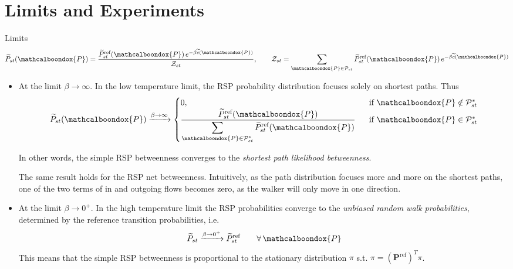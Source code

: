 \documentclass[13pt]{beamer}
\newcommand{\bondox}{\mathcalboondox}
\begin{document}
    \section{Limits and Experiments}

    \begin{frame}[t,allowframebreaks]{Limits}
    \begin{equation*}
    \widetilde{P}_{st}(\bondox{P})=\frac{\widetilde{P}_{st}^{\text{ref}}(\bondox{P})\,e^{-\beta\widetilde{c}(\bondox{P})}}{\mathcal{Z}_{st}},\qquad 
    \mathcal{Z}_{st}=\sum_{\bondox{P}\in \mathcal{P}_{st}}\widetilde{P}_{st}^{\text{ref}}(\bondox{P})\,e^{-\beta\widetilde{c}(\bondox{P})}
    \end{equation*}
    
    \begin{itemize}
        \item At the limit $\beta\to\infty$. In the low temperature limit, the RSP probability distribution focuses solely on shortest paths. Thus 
        \begin{equation*}
        \widetilde{P}_{st}(\bondox{P})\xrightarrow{\beta\to\infty}\begin{cases}
            0, &\ \text{ if }\bondox{P}\notin \mathcal{P}^*_{st}\\
            \dfrac{\widetilde{P}_{st}^{\text{ref}}(\bondox{P})}{\displaystyle \sum_{\bondox{P}\in\mathcal{P}^*_{st}} \widetilde{P}_{st}^{\text{ref}}(\bondox{P})} &\ \text{ if }\bondox{P}\in \mathcal{P}^*_{st}
        \end{cases}
        \end{equation*}


        In other words, the simple RSP  betweenness converges to the \emph{shortest path likelihood betweenness}.

        The same result holds for the RSP net betweenness. Intuitively, as the path distribution focuses more and more on the shortest paths, one of the two terms of in and outgoing flows becomes zero, as the walker will only move in one direction.

        \item At the limit $\beta\to0^+$. In the high temperature limit the RSP probabilities converge to the \emph{unbiased random walk probabilities}, determined by the reference transition probabilities, i.e. %
        \begin{equation*}
        \widetilde{P}_{st} \xrightarrow{\beta\to0^+}\widetilde{P}_{st}^{\text{ref}}\qquad\forall\, \bondox{P}
        \end{equation*}
        This means that the simple RSP betweenness is proportional to the stationary distribution $\pi$ s.t. $\pi=\left( \mathbf{P}^\text{ref} \right)^T\pi$.


\end{itemize}
\end{frame}
\end{document}
